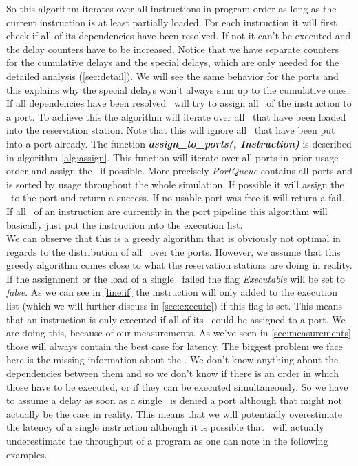 So this algorithm iterates over all instructions in program order as long as the current instruction is at least partially loaded. For each instruction it will first check if all of its dependencies have been resolved. If not it can't be executed and the delay counters have to be increased. Notice that we have separate counters for the cumulative delays and the special delays, which are only needed for the detailed analysis (\autoref{sec:detail}). We will see the same behavior for the ports and this explains why the special delays won't always sum up to the cumulative ones.\\
If all dependencies have been resolved \suaca\ will try to assign all \microops\ of the instruction to a port. To achieve this the algorithm will iterate over all \microops\ that have been loaded into the reservation station. Note that this will ignore all \microops\ that have been put into a port already. The function \textbf{\emph{assign\_to\_ports(\microop, Instruction)}} is described in algorithm \ref{alg:assign}. This function will iterate over all ports in prior usage order and assign the \microop\ if possible. More precisely \emph{PortQueue} contains all ports and is sorted by usage throughout the whole simulation. If possible it will assign the \microop\ to the port and return a success. If no usable port was free it will return a fail. If all \microops\ of an instruction are currently in the port pipeline this algorithm will basically just put the instruction into the execution list.\\
We can observe that this is a greedy algorithm that is obviously not optimal in regards to the distribution of all \microops\ over the ports. However, we assume that this greedy algorithm comes close to what the reservation stations are doing in reality.\\
If the assignment or the load of a single \microop\ failed the flag \emph{Executable} will be set to \emph{false}. As we can see in \autoref{line:if} the instruction will only added to the execution list (which we will further discuss in \autoref{sec:execute}) if this flag is set. This means that an instruction is only executed if all of its \microops\ could be assigned to a port. We are doing this, because of our measurements. As we've seen in \autoref{sec:measurements} those will always contain the best case for latency. The biggest problem we face here is the missing information about the \microops. We don't know anything about the dependencies between them and so we don't know if there is an order in which those have to be executed, or if they can be executed simultaneously. So we have to assume a delay as soon as a single \microop\ is denied a port although that might not actually be the case in reality. This means that we will potentially overestimate the latency of a single instruction although it is possible that \suaca\ will actually underestimate the throughput of a program as one can note in the following examples.\\


